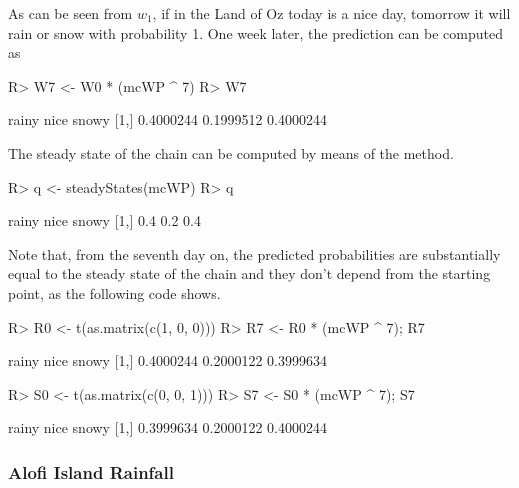 \documentclass[nojss]{jss}
\begin{document}
As can be seen from $w_{1}$, if in the Land of Oz today is a nice day, tomorrow it will rain or snow with probability 1. One week later, the prediction can be computed as

\begin{Schunk}
\begin{Sinput}
R> W7 <- W0 * (mcWP ^ 7)
R> W7
\end{Sinput}
\begin{Soutput}
         rainy      nice     snowy
[1,] 0.4000244 0.1999512 0.4000244
\end{Soutput}
\end{Schunk}

The steady state of the chain can be computed by means of the  method.

\begin{Schunk}
\begin{Sinput}
R> q <- steadyStates(mcWP)
R> q
\end{Sinput}
\begin{Soutput}
     rainy nice snowy
[1,]   0.4  0.2   0.4
\end{Soutput}
\end{Schunk}

Note that, from the seventh day on, the predicted probabilities are substantially equal to the steady state of the chain and they don't depend from the starting point, as the following code shows.


\begin{Schunk}
\begin{Sinput}
R> R0 <- t(as.matrix(c(1, 0, 0)))
R> R7 <- R0 * (mcWP ^ 7); R7
\end{Sinput}
\begin{Soutput}
         rainy      nice     snowy
[1,] 0.4000244 0.2000122 0.3999634
\end{Soutput}
\begin{Sinput}
R> S0 <- t(as.matrix(c(0, 0, 1)))
R> S7 <- S0 * (mcWP ^ 7); S7
\end{Sinput}
\begin{Soutput}
         rainy      nice     snowy
[1,] 0.3999634 0.2000122 0.4000244
\end{Soutput}
\end{Schunk}

\subsubsection{Alofi Island Rainfall}\label{sec:wfAlofi}
\end{document}
